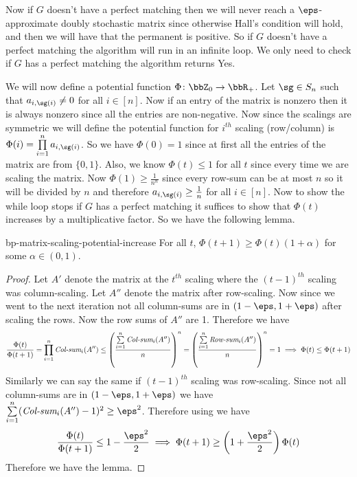 Now if $G$ doesn't have a perfect matching then we will never reach a $\eps$-approximate doubly stochastic matrix since otherwise Hall's condition will hold, and then we will have that the permanent is positive. So if $G$ doesn't have a perfect matching the algorithm will run in an infinite loop. We only need to check if $G$ has a perfect matching the algorithm returns Yes.

We will now define a potential function $\Phi\colon \bbZ_0\to \bbR_+$. Let $\sg\in S_n$ such that $a_{i,\sg(i)}\neq 0$ for all $i\in[n]$. Now if an entry of the matrix is nonzero then it is always nonzero since all the entries are non-negative. Now since the scalings are symmetric we will define the potential function for $i^{th}$ scaling (row/column) is $\Phi(i)=\prod\limits_{i=1}^n a_{i,\sg(i)}$. So we have $\Phi(0)=1$ since at first all the entries of the matrix are from $\{0,1\}$. Also, we know $\Phi(t)\leq 1$ for all $t$ since every time we are scaling the matrix. Now $\Phi(1)\geq \frac1{n^n}$ since every row-sum can be at most $n$ so it will be divided by $n$ and therefore $a_{i,\sg(i)}\geq \frac1n$ for all $i\in[n]$. Now to show the while loop stops if $G$ has a perfect matching it suffices to show that $\Phi(t)$ increases by a multiplicative factor. So we have the following lemma.
\begin{lemma}{}{bp-matrix-scaling-potential-increase}
	For all $t$, 	$\Phi(t+1)\geq \Phi(t)(1+\alpha)$ for some $\alpha\in (0,1)$.
\end{lemma}
\begin{proof}
	Let $A'$ denote the matrix at the $t^{th}$ scaling where the $(t-1)^{th}$ scaling was column-scaling. Let $A''$ denote the matrix after row-scaling. Now since we went to the next iteration not all column-sums are in $(1-\eps, 1+\eps)$ after scaling the rows. Now the row sums of $A''$ are 1. Therefore we have $$\frac{\Phi(t)}{\Phi(t+1)}= \prod_{i=1}^n\emph{Col-sum}_i(A'')\leq \left(\frac{\sum\limits_{i=1}^n \emph{Col-sum}_i(A'')}n\right)^n=\left(\frac{\sum\limits_{i=1}^n \emph{Row-sum}_i(A'')}n\right)^n=1\implies \Phi(t)\leq \Phi(t+1)$$Similarly we can say the same if $(t-1)^{th}$ scaling was row-scaling. Since  not all column-sums are in $(1-\eps, 1+\eps)$ we have $\sum\limits_{i=1}^n(\emph{Col-sum}_i(A'')-1)^2\geq \eps^2$. Therefore using  we have $$\frac{\Phi(t)}{\Phi(t+1)}\leq 1-\frac{\eps^2}{2}\implies\Phi(t+1)\geq \lt(1+\frac{\eps^2}2\rt)\Phi(t)$$Therefore we have the lemma.
\end{proof}

